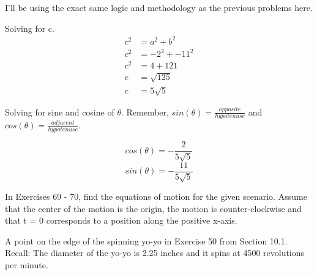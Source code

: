 \documentclass[10pt,letterpaper]{amspset}
\begin{document}
\begin{solution}[Solution]
I'll be using the exact same logic and methodology as the previous problems here. 
\bigskip

\bigskip

Solving for c.
\begin{align}
    c^2 &= a^2 + b^2 \\
    c^2 &= -2^2 + -11^2 \\
    c^2 &= 4 + 121 \\
    c &= \sqrt{125} \\
    c &= 5\sqrt{5}
\end{align}

Solving for sine and cosine of $\theta$. Remember, $sin(\theta) = \frac{opposite}{hypotenuse}$ and $cos(\theta) = \frac{adjacent}{hypotenuse}$.

\[\boxed{cos(\theta) = -\frac{2}{5\sqrt{5}}}\]
\[\boxed{sin(\theta) = -\frac{11}{5\sqrt{5}}}\]
\end{solution}


\pagebreak


In Exercises 69 - 70, find the equations of motion for the given scenario. Assume that the center of
the motion is the origin, the motion is counter-clockwise and that t = 0 corresponds to a position
along the positive x-axis.

\begin{problem}[69.]
A point on the edge of the spinning yo-yo in Exercise 50 from Section 10.1.
Recall: The diameter of the yo-yo is 2.25 inches and it spins at 4500 revolutions per minute.
\end{problem}
\end{document}

